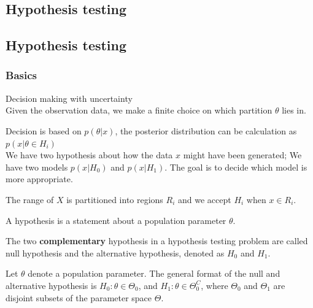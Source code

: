 \begin{refsection}
\startcontents[chapters]

\chapter{Hypothesis testing}

\section{Hypothesis testing}
\subsection{Basics}
\begin{mdframed}
	Decision making with uncertainty\\
	Given the observation data, we make a finite choice on which partition  $\theta$ lies in. 
	
	Decision is based on $p(\theta|x)$, the posterior distribution can be calculation as $p(x|\theta \in H_i)$\\
	
	We have two hypothesis about how the data $x$ might have been generated; We have two models $p(x|H_0)$ and $p(x|H_1)$. The goal is to decide which model is more appropriate.
	
	
	
\end{mdframed}


\begin{definition}
	The range of $X$ is partitioned into regions $R_i$ and we accept $H_i$ when $x\in R_i$. 
\end{definition}


\begin{definition}[hypothesis]
	\cite[371]{casella2002statistical} A hypothesis is a statement about a population parameter $\theta$.
\end{definition}

\begin{definition}
	The two \textbf{complementary} hypothesis in a hypothesis testing problem are called null hypothesis and the alternative hypothesis, denoted as $H_0$ and $H_1$.
\end{definition}

\begin{remark}
	Let $\theta$ denote a population parameter. The general format of the null and alternative hypothesis is $H_0:\theta \in \Theta_0$, and $H_1:\theta \in\Theta_0^C$, where $\Theta_0$ and $\Theta_1$  are disjoint subsets of the parameter space $\Theta$.
\end{remark}


\end{refsection}
